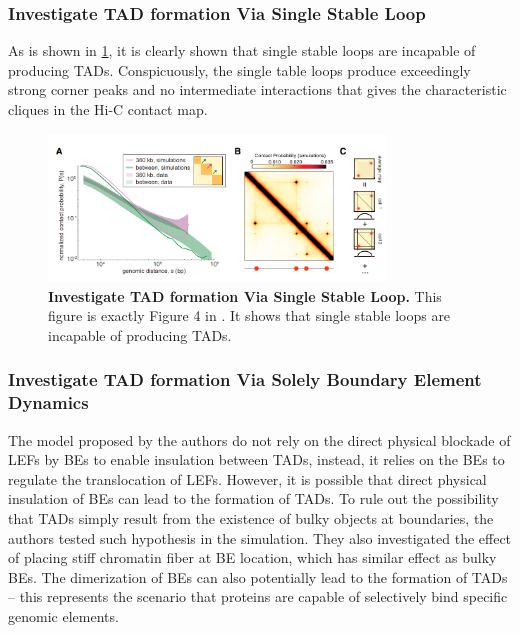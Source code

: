 \documentclass[11pt]{article}
\begin{document}
\subsubsection*{Investigate TAD formation Via Single Stable Loop}

As is shown in \cref{fig:Investigate TAD formation Via Single Stable Loop}, it is clearly shown that single stable loops are incapable of producing TADs. Conspicuously, the single table loops produce exceedingly strong corner peaks and no intermediate interactions that gives the characteristic cliques in the Hi-C contact map.

\begin{figure}[htbp]
  \centering
  \includegraphics[width=0.8\textwidth]{assets/Snipaste_2023-01-13_18-37-34.png}
  \caption{\textbf{Investigate TAD formation Via Single Stable Loop.} This figure is exactly Figure 4 in \cite{fudenberg_formation_2016}. It shows that single stable loops are incapable of producing TADs.}
  \label{fig:Investigate TAD formation Via Single Stable Loop}
\end{figure}

\subsubsection*{Investigate TAD formation Via Solely Boundary Element Dynamics}

The model proposed by the authors do not rely on the direct physical blockade of LEFs by BEs to enable insulation between TADs, instead, it relies on the BEs to regulate the translocation of LEFs. However, it is possible that direct physical insulation of BEs can lead to the formation of TADs. To rule out the possibility that TADs simply result from the existence of bulky objects at boundaries, the authors tested such hypothesis in the simulation. They also investigated the effect of placing stiff chromatin fiber at BE location, which has similar effect as bulky BEs. The dimerization of BEs can also potentially lead to the formation of TADs -- this represents the scenario that proteins are capable of selectively bind specific genomic elements.
\end{document}
